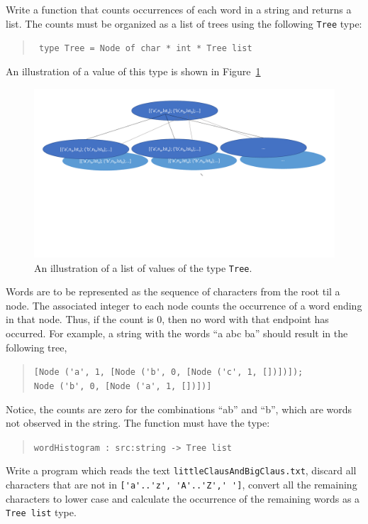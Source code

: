 \label{wordHistogram}
Write a function that counts occurrences of each word in a string and
returns a list. The counts must be organized as a list of trees using the
following \lstinline{Tree} type:
\begin{quote}
  \mbox{\lstinline! type Tree = Node of char * int * Tree list!}
\end{quote}
An illustration of a value of this type is shown in Figure~\ref{fig:treeType}
\begin{figure}
  \centering
  \includegraphics[width=\textwidth]{treeType}
  \caption{An illustration of a list of values of the type \lstinline{Tree}.}
  \label{fig:treeType}
\end{figure}
Words are to be represented as the sequence of characters from the
root til a node. The associated integer to each node counts the
occurrence of a word ending in that node. Thus, if the count is 0, then
no word with that endpoint has occurred. For example, a string with the
words ``a abc ba'' should result in the following tree,
\begin{quote}
  \mbox{\lstinline![Node ('a', 1, [Node ('b', 0, [Node ('c', 1, [])])]);!}\\
  \mbox{\hspace{0.5em}\lstinline!Node ('b', 0, [Node ('a', 1, [])])]!}
\end{quote}
Notice, the counts are zero for the combinations ``ab'' and ``b'',
which are words not observed in the string. The function must have the type:
\begin{quote}
  \mbox{\lstinline!wordHistogram : src:string -> Tree list!}
\end{quote}
Write a program which reads the text \lstinline[language=console]{littleClausAndBigClaus.txt}, discard all characters that are not in \lstinline{['a'..'z', 'A'..'Z',' ']}, convert all the remaining characters to lower case and calculate the occurrence of the remaining words as a \lstinline{Tree list} type.
